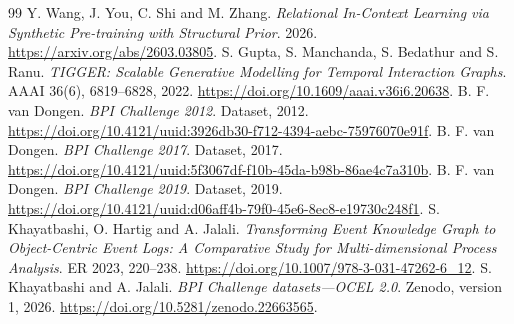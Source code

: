 \begin{thebibliography}{99}
 Y. Wang, J. You, C. Shi and M. Zhang. \emph{Relational In-Context Learning via Synthetic Pre-training with Structural Prior}. 2026. \url{https://arxiv.org/abs/2603.03805}.
 S. Gupta, S. Manchanda, S. Bedathur and S. Ranu. \emph{TIGGER: Scalable Generative Modelling for Temporal Interaction Graphs}. AAAI 36(6), 6819--6828, 2022. \url{https://doi.org/10.1609/aaai.v36i6.20638}.
 B. F. van Dongen. \emph{BPI Challenge 2012}. Dataset, 2012. \url{https://doi.org/10.4121/uuid:3926db30-f712-4394-aebc-75976070e91f}.
 B. F. van Dongen. \emph{BPI Challenge 2017}. Dataset, 2017. \url{https://doi.org/10.4121/uuid:5f3067df-f10b-45da-b98b-86ae4c7a310b}.
 B. F. van Dongen. \emph{BPI Challenge 2019}. Dataset, 2019. \url{https://doi.org/10.4121/uuid:d06aff4b-79f0-45e6-8ec8-e19730c248f1}.
 S. Khayatbashi, O. Hartig and A. Jalali. \emph{Transforming Event Knowledge Graph to Object-Centric Event Logs: A Comparative Study for Multi-dimensional Process Analysis}. ER 2023, 220--238. \url{https://doi.org/10.1007/978-3-031-47262-6_12}.
 S. Khayatbashi and A. Jalali. \emph{BPI Challenge datasets---OCEL 2.0}. Zenodo, version 1, 2026. \url{https://doi.org/10.5281/zenodo.22663565}.
\end{thebibliography}
